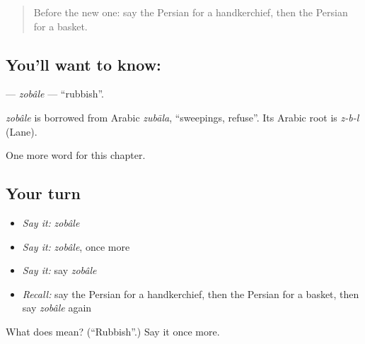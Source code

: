 \label{lesson:FA-C239-zobale}



\begin{quote}
Before the new one: say the Persian for a handkerchief, then the Persian for a basket.
\end{quote}

\subsection*{You'll want to know: }
\textbf{} — \emph{zobâle} — \textquotedblleft{}rubbish\textquotedblright{}.

\begin{cousinweb}
\emph{zobâle} is borrowed from Arabic \emph{zubāla}, \textquotedblleft{}sweepings, refuse\textquotedblright{}. Its Arabic root is \emph{z-b-l} (Lane).
\end{cousinweb}

\begin{grammarlens}[title={What you've built}]
One more word for this chapter.
\end{grammarlens}

\subsection*{Your turn}
\begin{itemize}
\raggedright
  \item \emph{Say it:} \emph{zobâle}
  \item \emph{Say it:} \emph{zobâle}, once more
  \item \emph{Say it:} say \emph{zobâle}
  \item \emph{Recall:} say the Persian for a handkerchief, then the Persian for a basket, then say \emph{zobâle} again
\end{itemize}

\begin{tcolorbox}[breakable,colback=teal!4,colframe=teal!35!black,title={Before you move on}]
What does  mean? (\textquotedblleft{}Rubbish\textquotedblright{}.) Say it once more.
\end{tcolorbox}
